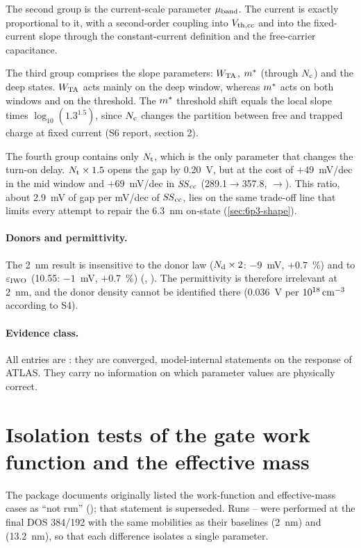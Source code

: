 The second group is the current-scale parameter $\mu_{\mathrm{band}}$. The current is exactly proportional to it, with a second-order coupling into $V_{\mathrm{th,cc}}$ and into the fixed-current slope through the constant-current definition and the free-carrier capacitance.

The third group comprises the slope parameters: $W_{\mathrm{TA}}$, $m^{*}$ (through $N_{\mathrm{c}}$) and the deep states. $W_{\mathrm{TA}}$ acts mainly on the deep window, whereas $m^{*}$ acts on both windows and on the threshold. The $m^{*}$ threshold shift equals the local slope times $\log_{10}(1.3^{1.5})$, since $N_{\mathrm{c}}$ changes the partition between free and trapped charge at fixed current (S6 report, section 2).

The fourth group contains only $N_{\mathrm{t}}$, which is the only parameter that changes the turn-on delay. $N_{\mathrm{t}}\times1.5$ opens the gap by 0.20~V, but at the cost of $+49$~mV/dec in the mid window and $+69$~mV/dec in $\mathit{SS}_{\mathrm{cc}}$ (289.1$\rightarrow$357.8, $\rightarrow$). This ratio, about 2.9~mV of gap per mV/dec of $\mathit{SS}_{\mathrm{cc}}$, lies on the same trade-off line that limits every attempt to repair the 6.3~nm on-state (\cref{sec:6p3-shape}).

\paragraph{Donors and permittivity.} The 2~nm result is insensitive to the donor law ($N_{\mathrm{d}}\times2$: $-9$~mV, $+0.7$~\%) and to $\varepsilon_{\mathrm{IWO}}$ (10.55: $-1$~mV, $+0.7$~\%) (, ). The permittivity is therefore irrelevant at 2~nm, and the donor density cannot be identified there (0.036~V per $10^{18}\,\mathrm{cm}^{-3}$ according to S4).

\paragraph{Evidence class.} All entries are \evNUM: they are converged, model-internal statements on the response of ATLAS. They carry no information on which parameter values are physically correct.

\section{Isolation tests of the gate work function and the effective mass}\label{sec:cal-isolation}

The package documents originally listed the work-function and effective-mass cases as ``not run'' (); that statement is superseded. Runs -- were performed at the final DOS 384/192 with the same mobilities as their baselines  (2~nm) and  (13.2~nm), so that each difference isolates a single parameter.

